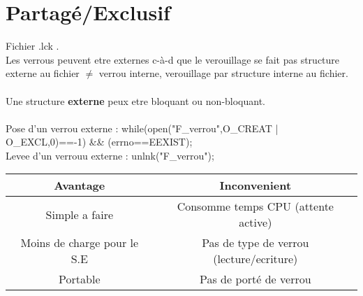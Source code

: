 \documentclass[a4paper,12pt,openany]{book}
\begin{document}
\section{Partagé/Exclusif}
Fichier .lck .\\
Les verrous peuvent etre externes c-à-d que le verouillage se fait pas structure externe au fichier $\neq$ verrou interne, verouillage par structure interne au fichier.\\
\\
Une structure \textbf{externe} peux etre bloquant ou non-bloquant.\\
\\
Pose d'un verrou externe : while(open("F_verrou",O_CREAT | O_EXCL,0)==-1) && (errno==EEXIST);\\
Levee d'un verrouu externe : unlnk("F_verrou");
\\
\begin{tabular}{|c|c|}
\hline
Avantage & Inconvenient \\ \hline
Simple a faire & Consomme temps CPU (attente active) \\ 
Moins de charge pour le S.E & Pas de type de verrou (lecture/ecriture) \\
Portable &  Pas de porté de verrou \\ \hline
\end{tabular}
\\
\end{document}
